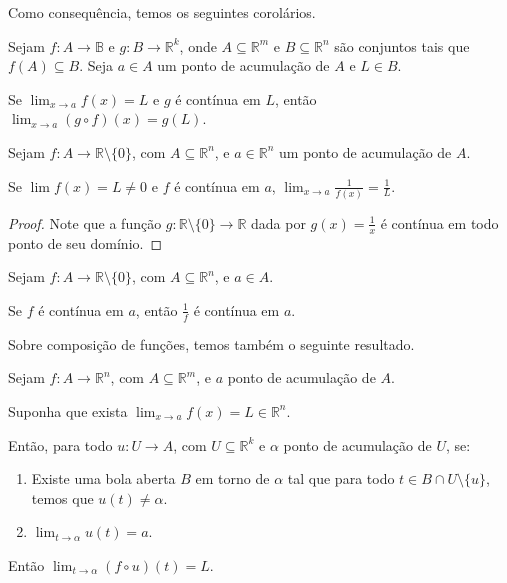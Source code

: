 Como consequência, temos os seguintes corolários.

\begin{corollary}
    Sejam $f: A \to \mathbb B$ e $g: B \to \mathbb R^k$, onde $A\subseteq \mathbb R^m$ e $B\subseteq \mathbb R^n$ são conjuntos tais que $f(A)\subseteq B$.
    Seja $a \in A$ um ponto de acumulação de $A$ e $L \in B$.

    Se $\lim_{x\to a} f(x) = L$ e $g$ é contínua em $L$, então $\lim_{x\to a} (g\circ f)(x) = g(L)$.
\end{corollary}

\begin{corollary}
    Sejam $f: A \to \mathbb R\setminus \{0\}$, com $A\subseteq \mathbb R^n$, e $a \in \mathbb R^n$ um ponto de acumulação de $A$.

    Se $\lim f(x) = L \neq 0$ e $f$ é contínua em $a$, $\lim_{x\to a} \frac{1}{f(x)} = \frac{1}{L}$.
\end{corollary}

\begin{proof}
    Note que a função $g:\mathbb R\setminus\{0\}\rightarrow \mathbb R$ dada por $g(x) = \frac{1}{x}$ é contínua em todo ponto de seu domínio.
\end{proof}

\begin{corollary}
    Sejam $f: A \to \mathbb R\setminus \{0\}$, com $A\subseteq \mathbb R^n$, e $a \in A$.

    Se $f$ é contínua em $a$, então $\frac{1}{f}$ é contínua em $a$.
\end{corollary}

Sobre composição de funções, temos também o seguinte resultado.
\begin{proposition}
    Sejam $f: A \rightarrow \mathbb R^n$, com $A\subseteq \mathbb R^m$, e $a$ ponto de acumulação de $A$.

    Suponha que exista $\lim_{x\to a} f(x) = L \in \mathbb R^n$.

    Então, para todo $u: U\rightarrow A$, com $U\subseteq \mathbb R^k$ e $\alpha$ ponto de acumulação de $U$, se:

    \begin{enumerate}[label=(\alph*)]
        \item Existe uma bola aberta $B$ em torno de $\alpha$ tal que para todo $t \in B\cap U\setminus\{u\}$, temos que $u(t)\neq \alpha$.
        \item $\lim_{t\to \alpha} u(t) = a$.
    \end{enumerate}

    Então $\lim_{t\to \alpha} (f\circ u)(t) = L$.
\end{proposition}

